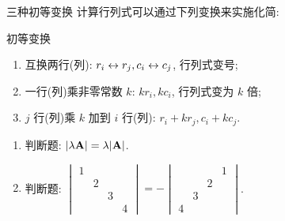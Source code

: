 \begin{frame}{三种初等变换}
	\onslide<+->
	计算行列式可以通过下列变换来实施化简:
	\onslide<+->
	\begin{block}{初等变换}
		\begin{enumerate}
			\item 互换两行(列): \alert{$r_i\leftrightarrow r_j, c_i\leftrightarrow c_j$}, 行列式变号;
			\item 一行(列)乘非零常数 $k$: \alert{$kr_i, kc_i$}, 行列式变为 $k$ 倍;
			\item $j$ 行(列)乘 $k$ 加到 $i$ 行(列): \alert{$r_i+kr_j, c_i+kc_j$}.
		\end{enumerate}
	\end{block}
	\onslide<+->
	\begin{exercise}
		\begin{enumerate}
			\item 判断题: $|\lambda {\mathbf{A}}|=\lambda|{\mathbf{A}}|$. \visible<+->{\alert{$|\lambda \bfA|=\lambda^n|\bfA|$}}
			\item 判断题: $\begin{vmatrix}
				1&&&\\&2&&\\&&3&\\&&&4
			\end{vmatrix}=-\begin{vmatrix}
				&&&1\\&&2&\\&3&&\\4&&&
			\end{vmatrix}$. \visible<+->{\Huge\alert{$\times$}}
		\end{enumerate}
	\end{exercise}
\end{frame}


